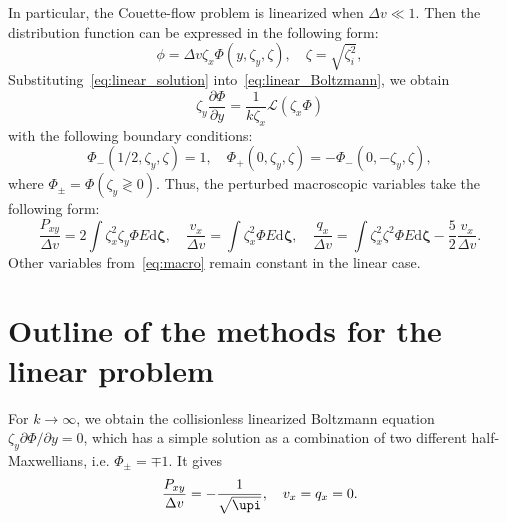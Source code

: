 \documentclass[]{jfm}
\newcommand{\dd}{\mathrm{d}}
\newcommand{\pder}[2][]{\frac{\partial#1}{\partial#2}}
\newcommand{\Pder}[2][]{\partial#1/\partial#2}
\newcommand{\dzeta}{\boldsymbol{\dd\zeta}}
\begin{document}
In particular, the Couette-flow problem is linearized when \(\Delta{v}\ll 1\).
Then the distribution function can be expressed in the following form:
\begin{equation}\label{eq:linear_solution}
    \phi = \Delta{v} \zeta_x \Phi(y,\zeta_y,\zeta), \quad \zeta = \sqrt{\zeta_i^2},
\end{equation}
Substituting~\eqref{eq:linear_solution} into~\eqref{eq:linear_Boltzmann}, we obtain
\begin{equation}\label{eq:linear_equation}
    \zeta_y \pder[\Phi]{y} = \frac1{k\zeta_x}\mathcal{L}(\zeta_x\Phi)
\end{equation}
with the following boundary conditions:
\begin{equation}\label{eq:linear_bc}
    \Phi_-(1/2,\zeta_y,\zeta) = 1, \quad \Phi_+(0,\zeta_y,\zeta) = -\Phi_-(0,-\zeta_y,\zeta),
\end{equation}
where \(\Phi_\pm = \Phi(\zeta_y \gtrless 0)\).
Thus, the perturbed macroscopic variables take the following form:
\begin{equation}\label{eq:linear_macro}
    \frac{P_{xy}}{\Delta{v}} = 2\int \zeta_x^2 \zeta_y \Phi E\dzeta, \quad
    \frac{v_x}{\Delta{v}} = \int \zeta_x^2 \Phi E\dzeta, \quad
    \frac{q_x}{\Delta{v}} = \int \zeta_x^2 \zeta^2 \Phi E\dzeta - \frac52 \frac{v_x}{\Delta{v}}.
\end{equation}
Other variables from~\eqref{eq:macro} remain constant in the linear case.

\section{Outline of the methods for the linear problem}

For \(k\to\infty\), we obtain the collisionless linearized Boltzmann equation \(\zeta_y\Pder[\Phi]{y} = 0\),
which has a simple solution as a combination of two different half-Maxwellians, i.e. \(\Phi_\pm = \mp 1\).
It gives
\begin{gather}\label{eq:linear_free_macro}
    \frac{P_{xy}}{\Delta{v}} = -\frac1{\sqrt{\upi}}, \quad v_x = q_x = 0.
\end{gather}
\end{document}
